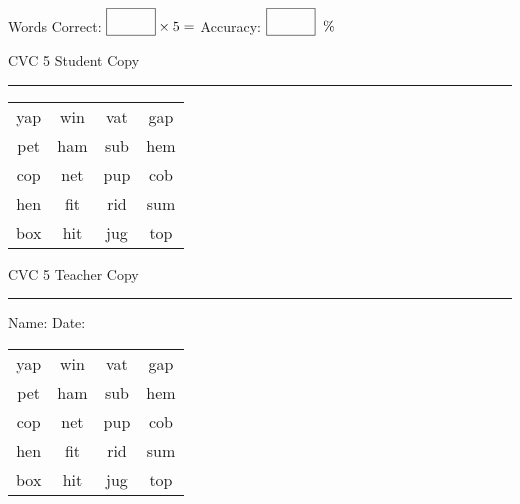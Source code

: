 \documentclass{memoir}
\begin{document}
\normalsize

Words Correct: $\fbox{\phantom{\huge 100}} \times 5 = $ Accuracy: $\fbox{\phantom{\huge 100}}\;\; \%$ 

\vfill

\newpage


\footnotesize \noindent
CVC 5 \hfill Student Copy
\smallskip
\hrule

\huge

\setlength{\tabcolsep}{14pt}
\def\arraystretch{2}

{\selectfont


\begin{vplace}[0.5]
\begin{center}
\begin{tabular}{cccc}
yap & win & vat & gap \\
pet & ham & sub & hem \\
cop & net & pup & cob \\
hen & fit & rid & sum \\
box & hit & jug & top \\
\end{tabular}
\end{center}
\end{vplace}

}

\newpage

\footnotesize \noindent
CVC 5 \hfill Teacher Copy
\smallskip
\hrule

\normalsize

\vfill

\noindent
Name: \underline{\hspace{1.75in}} \hfill Date: \underline{\hspace{1in}}

\huge

{\selectfont


\begin{vplace}[0.5]
\begin{center}
\begin{tabular}{cccc}
yap & win & vat & gap \\
pet & ham & sub & hem \\
cop & net & pup & cob \\
hen & fit & rid & sum \\
box & hit & jug & top \\
\end{tabular}
\end{center}
\end{vplace}



}
\end{document}
